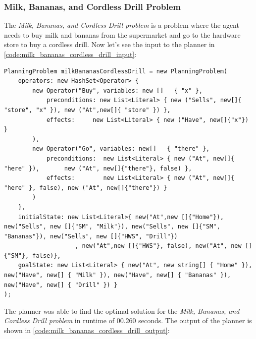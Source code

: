 \subsubsection{Milk, Bananas, and Cordless Drill Problem} \label{subsubsec:milk_bananas_cordless_drill_output}
The \textit{Milk, Bananas, and Cordless Drill problem} is a problem where the agent needs to buy milk and bananas from the supermarket and go to the hardware store to buy a cordless drill. Now let's see the input to the planner in \autoref{code:milk_bananas_cordless_drill_input}:

\begin{lstlisting}[language={[Sharp]C}, frame=single, basicstyle=\small\ttfamily, breaklines=true, captionpos=b, caption={Milk, Bananas, and Cordless Drill Problem Input to the Planner}, label={code:milk_bananas_cordless_drill_input}]
PlanningProblem milkBananasCordlessDrill = new PlanningProblem(
    operators: new HashSet<Operator> {
        new Operator("Buy", variables: new []   { "x" },
            preconditions: new List<Literal> { new ("Sells", new[]{ "store", "x" }), new ("At",new[]{ "store" }) },
            effects:     new List<Literal> { new ("Have", new[]{"x"}) }
        ),
        new Operator("Go", variables: new[]   { "there" },
            preconditions:  new List<Literal> { new ("At", new[]{ "here" }),       new ("At", new[]{"there"}, false) },
            effects:        new List<Literal> { new ("At", new[]{ "here" }, false), new ("At", new[]{"there"}) }
        )
    },
    initialState: new List<Literal>{ new("At",new []{"Home"}), new("Sells", new []{"SM", "Milk"}), new("Sells", new []{"SM", "Bananas"}), new("Sells", new []{"HWS", "Drill"})
                    , new("At",new []{"HWS"}, false), new("At", new []{"SM"}, false)},
    goalState: new List<Literal> { new("At", new string[] { "Home" }), new("Have", new[] { "Milk" }), new("Have", new[] { "Bananas" }), new("Have", new[] { "Drill" }) }
);
\end{lstlisting}

The planner was able to find the optimal solution for the \textit{Milk, Bananas, and Cordless Drill problem} in runtime of 00.260 seconds. The output of the planner is shown in \autoref{code:milk_bananas_cordless_drill_output}:

